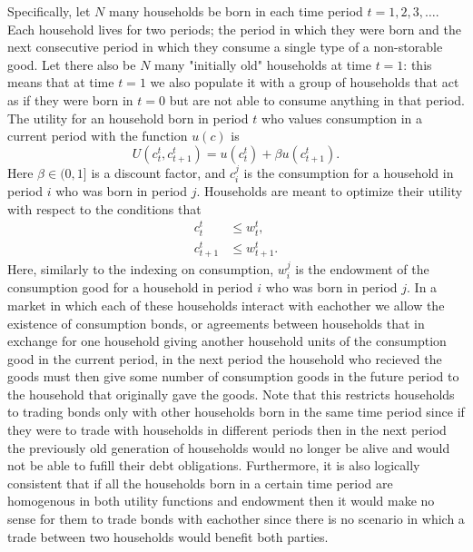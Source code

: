 \documentclass[11pt,english]{article}
\begin{document}
\noindent Specifically, let $N$ many households be born in each time period $t=1,2,3,\ldots$. Each household lives for two periods; the period in which they were born and the next consecutive period in which they consume a single type of a non-storable good. Let there also be $N$ many "initially old" households at time $t=1$: this means that at time $t=1$ we also populate it with a group of households that act as if they were born in $t=0$ but are not able to consume anything in that period. The utility for an household born in period $t$ who values consumption in a current period with the function $u(c)$ is $$U\left(c_t^t, c_{t+1}^t\right) = u\left(c_t^t\right) + \beta u\left(c_{t+1}^t\right).$$ Here $\beta\in (0,1]$ is a discount factor, and $c_i^j$ is the consumption for a household in period $i$ who was born in period $j$. Households are meant to optimize their utility with respect to the conditions that \begin{align*}c_t^{t} &\leq w_t^t,\\ 
c_{t+1}^t &\leq w_{t+1}^t.\end{align*} Here, similarly to the indexing on consumption, $w_i^j$ is the endowment of the consumption good for a household in period $i$ who was born in period $j$. In a market in which each of these households interact with eachother we allow the existence of consumption bonds, or agreements between households that in exchange for one household giving another household units of the consumption good in the current period, in the next period the household who recieved the goods must then give some number of consumption goods in the future period to the household that originally gave the goods. Note that this restricts households to trading bonds only with other households born in the same time period since if they were to trade with households in different periods then in the next period the previously old generation of households would no longer be alive and would not be able to fufill their debt obligations. Furthermore, it is also logically consistent that if all the households born in a certain time period are homogenous in both utility functions and endowment then it would make no sense for them to trade bonds with eachother since there is no scenario in which a trade between two households would benefit both parties.\\
\end{document}
